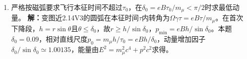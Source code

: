 \documentclass[UTF8,fontset=fandol,a4paper,11pt]{ctexart}
\begin{document}
\begin{enumerate}
\item 严格按磁弧要求飞行本征时间不超过$\tau_0$，在$\delta_0=eB\tau_0/m_\mu<\pi/2$时求最低动量。
\textbf{解：}变图近2.14V3的圆弧在本征时间$\tau$内转角为$\Omega\gamma\tau=eB\tau/m_\mu$。在首次下降段，$h=r\sin\theta$且$\theta\le\delta_0$，故$r\ge h/\sin\delta_0$，$p_{\min}=eBh/\sin\delta_0$。本题$\delta_0=0.09$，相对直线尺度$p_0=m_\mu h/\tau_0=eBh/\delta_0$，动量增加因子$\delta_0/\sin\delta_0\simeq1.00135$，能量由$E^2=m_\mu^2c^4+p^2c^2$求得。
\begin{center}\begin{minipage}{.98\linewidth}\centering
{}
\end{minipage}
\end{center}
\end{enumerate}
\end{document}
